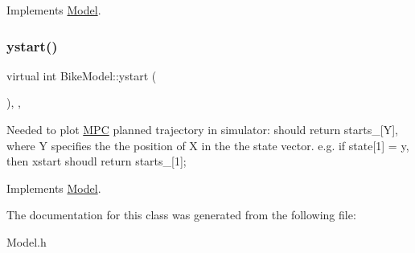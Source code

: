 Implements \mbox{\hyperlink{classModel_ab98f8c18036d9bada533325300865c5e}{Model}}.

\mbox{\label{classBikeModel_a05b988f106df902d1222dfb662d4b1fa}} 
\subsubsection{\texorpdfstring{ystart()}{ystart()}}
{\footnotesize\ttfamily virtual int Bike\+Model\+::ystart (\begin{DoxyParamCaption}{ }\end{DoxyParamCaption})\hspace{0.3cm}{\ttfamily [inline]}, {\ttfamily [override]}, {\ttfamily [virtual]}}

Needed to plot \mbox{\hyperlink{classMPC}{M\+PC}} planned trajectory in simulator\+: should return starts\+\_\+\mbox{[}Y\mbox{]}, where Y specifies the the position of X in the the state vector. e.\+g. if state\mbox{[}1\mbox{]} = y, then xstart shoudl return starts\+\_\+\mbox{[}1\mbox{]}; 

Implements \mbox{\hyperlink{classModel_ae505a277c05e465d0a41fa75d4116350}{Model}}.



The documentation for this class was generated from the following file\+:\begin{DoxyCompactItemize}
\item 
Model.\+h\end{DoxyCompactItemize}
